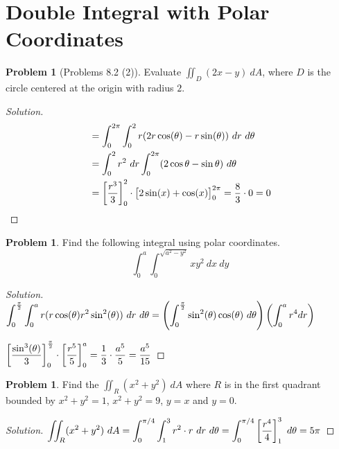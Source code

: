 \documentclass[12pt]{amsart}%
\theoremstyle{plain}
\theoremstyle{definition}
\newtheorem{prob}[theorem]{Problem}
\theoremstyle{special}
\newcommand{\sol}[1]{
{\begin{proof}[Solution]#1\end{proof}}
}
\newcommand{\Prob}[1]{\begin{tcolorbox}%
\begin{prob}
	#1
\end{prob}
\end{tcolorbox}	
}
\begin{document}
\section{Double Integral with Polar Coordinates}
\Prob{[Problems 8.2 (2)]
Evaluate $\displaystyle\iint_D(2x-y)\ dA$, where $D$ is the circle centered at the origin with radius $2$.
}
\sol{
\begin{align*}&=\int_0^{2\pi} \int_0^2 r(2r\cos(\theta)-r\sin(\theta))\ dr\ d\theta\\&=\int_0^2r^2 \ dr \int_0^{2\pi}(2\cos\theta-\sin\theta)\ d\theta \\
&=\left[r^3\over 3\right]_0^2\cdot\big [2\sin(x)+\cos(x)\big ]_0^{2\pi}={8\over 3}\cdot 0=0 \end{align*}}

\Prob{Find the following integral using polar coordinates.
\[\int_0^a\int_{0}^{\sqrt{a^2-y^2}}xy^2\ dx\ dy\]
}

\sol{
$\displaystyle\int_{0}^{\pi\over 2}\int_0^a r(r\cos(\theta)r^2\sin^2(\theta))\ d r\ d \theta=\left(\int_{0}^{\pi\over 2} \sin^2(\theta)\cos(\theta) \ d\theta\right)\left(\int_0^a r^4  dr\right)$

$\displaystyle \left[\sin^3(\theta)\over 3\right]_{0}^{\pi\over 2}\cdot \left[ r^5\over 5\right]_0^a={1\over 3}\cdot {a^5\over 5}={a^5\over 15}$
}

\Prob{Find the $\displaystyle\iint_R (x^2+y^2)\ dA$ where $R$ is in the first quadrant bounded by $x^2+y^2=1$, $x^2+y^2=9$, $y=x$ and $y=0$.}
\sol{
$\displaystyle
\iint_R (x^2+y^2)\ dA=\int_0^{\pi/4}	\int_1^3 r^2\cdot r\ dr\ d\theta=\int_0^{\pi/4}\left[r^4\over 4\right]^3_1\ d\theta=5\pi
$

}
\newpage
\end{document}
